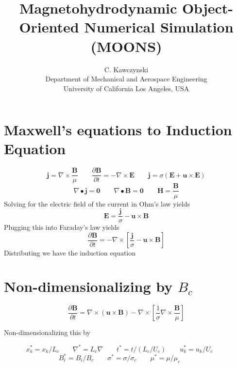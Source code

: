 \documentclass[11pt]{article}
\begin{document}
\doublespacing
\title{Magnetohydrodynamic Object-Oriented Numerical Simulation (MOONS)}
\author{C. Kawczynski \\
Department of Mechanical and Aerospace Engineering \\
University of California Los Angeles, USA\\
}
\maketitle

\section{Maxwell's equations to Induction Equation}
\begin{equation}
	\pmb{j} = \nabla \times \frac{\pmb{B}}{\mu}
	\qquad
	\frac{\partial \pmb{B}}{\partial t} = 
	- \nabla \times \pmb{E}
	\qquad
	\pmb{j} = \sigma (\pmb{E} + \pmb{u}\times \pmb{E})
\end{equation}
\begin{equation}
	\nabla \bullet \pmb{j} = \pmb{0}
	\qquad
	\nabla \bullet \pmb{B} = \pmb{0}
	\qquad
	\pmb{H} = \frac{\pmb{B}}{\mu}
\end{equation}
Solving for the electric field of the current in Ohm's law yields
\begin{equation}
	\pmb{E} = \frac{\pmb{j}}{\sigma} - \pmb{u} \times \pmb{B}
\end{equation}
Plugging this into Faraday's law yields
\begin{equation}
	\frac{\partial \pmb{B}}{\partial t} = 
	- \nabla \times \left[ \frac{\pmb{j}}{\sigma}
	- \pmb{u} \times \pmb{B} \right]
\end{equation}
Distributing we have the induction equation

\section{Non-dimensionalizing by \texorpdfstring{$B_c$}{LG}}

\begin{equation}
	\frac{\partial \pmb{B}}{\partial t} = 
	\nabla \times (\pmb{u} \times \pmb{B})
	- \nabla \times 
	\left[ \frac{1}{\sigma}
	\nabla \times \frac{\pmb{B}}{\mu} \right]
\end{equation}

Non-dimensionalizing this by

\begin{equation*}
	x_k^* = x_k/L_c \qquad
	\nabla^* = L_c \nabla \qquad
	t^* = t/(L_c/U_c) \qquad
	u_k^* = u_k/U_c \qquad
	\end{equation*}
	\begin{equation*}
	B_i^* = B_i/B_c  \qquad
	\sigma^* = \sigma/\sigma_c \qquad
	\mu^* = \mu/\mu_c \qquad
\end{equation*}
\end{document}
